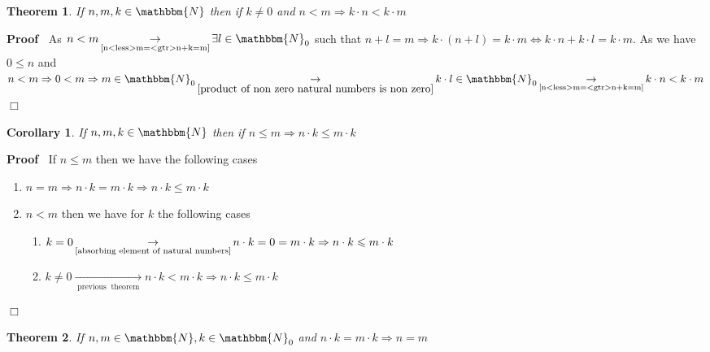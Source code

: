 \documentclass{book}
\newcommand{\Rightarrowlim}{\mathop{\rightarrow}\limits}
\newcommand{\tmop}[1]{\ensuremath{\operatorname{#1}}}
\newcommand{\upl}{+}
\newenvironment{proof}{\noindent\textbf{Proof\ }}{\hspace*{\fill}$\Box$\medskip}
\newtheorem{corollary}{Corollary}
\newtheorem{theorem}{Theorem}
\begin{document}
{{\begin{theorem}
  \label{n<less>m=<gtr>nk<less>mk}If $n, m, k \in \mathbbm{N}$ then if $k \neq
  0$ and $n < m \Rightarrow k \cdot n < k \cdot m$
\end{theorem}

\begin{proof}
  As $n < m \Rightarrowlim_{\text{\ref{n<less>m=<gtr>n+k=m}}} \exists l \in
  \mathbbm{N}_0$ such that $n \upl l = m \Rightarrow k \cdot (n \upl l) = k
  \cdot m \Leftrightarrow k \cdot n \upl k \cdot l = k \cdot m$. As we have $0
  \leqslant n$ and $n < m \Rightarrow 0 < m \Rightarrow m \in \mathbbm{N}_0
  \Rightarrowlim_{\text{} \ref{product of non zero natural numbers is non
  zero}} k \cdot l \in \mathbbm{N}_0
  \Rightarrowlim_{\text{\ref{n<less>m=<gtr>n+k=m}}} k \cdot n < k \cdot m$
\end{proof}

\begin{corollary}
  \label{n<less>=m=<gtr>n.k<less>=m.k}If $n, m, k \in \mathbbm{N}$ then if $n
  \leqslant m \Rightarrow n \cdot k \leqslant m \cdot k$
\end{corollary}

\begin{proof}
  If $n \leqslant m$ then we have the following cases
  \begin{enumerate}
    \item $n = m \Rightarrow n \cdot k = m \cdot k \Rightarrow n \cdot k
    \leqslant m \cdot k$
    
    \item $n < m$ then we have for $k$ the following cases
    \begin{enumerate}
      \item $k = 0 \Rightarrowlim_{\text{\ref{absorbing element of natural
      numbers}}} n \cdot k = 0 = m \cdot k \Rightarrow n \cdot k \leqslant m
      \cdot k$
      
      \item $k \neq 0 \Rightarrowlim_{\tmop{previous} \tmop{theorem}} n \cdot
      k < m \cdot k \Rightarrow n \cdot k \leqslant m \cdot k$
    \end{enumerate}
  \end{enumerate}
\end{proof}

\begin{theorem}
  \label{elemination of non zero common factor in natural numbers}If $n, m \in
  \mathbbm{N}, k \in \mathbbm{N}_0$ and $n \cdot k = m \cdot k \Rightarrow n =
  m$
\end{theorem}

}}
\end{document}
